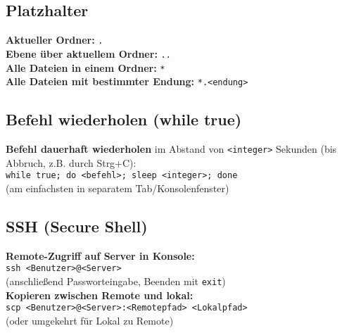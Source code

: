 \documentclass[a4paper, twocolumn]{scrarticle}
\begin{document}
\subsection{Platzhalter}
\textbf{Aktueller Ordner:} \lstinline|.|\\
\textbf{Ebene über aktuellem Ordner:} \lstinline|..|\\
\textbf{Alle Dateien in einem Ordner:} \lstinline|*|\\
\textbf{Alle Dateien mit bestimmter Endung:} \lstinline|*.<endung>|

\subsection{Befehl wiederholen (while true)}\label{sec:bash-whiletrue}
\textbf{Befehl dauerhaft wiederholen} im Abstand von \lstinline|<integer>| Sekunden (bis Abbruch, z.B. durch Strg+C):\\ \lstinline|while true; do <befehl>; sleep <integer>; done|\\
(am einfachsten in separatem Tab/Konsolenfenster)

\subsection{SSH (Secure Shell)}
\textbf{Remote-Zugriff auf Server in Konsole:}\\
\lstinline|ssh <Benutzer>@<Server>|\\
(anschließend Passworteingabe, Beenden mit \lstinline|exit|)\\
\textbf{Kopieren zwischen Remote und lokal:}\\
\lstinline|scp <Benutzer>@<Server>:<Remotepfad> <Lokalpfad>|\\
(oder umgekehrt für Lokal zu Remote)
\end{document}
